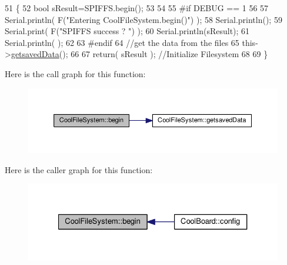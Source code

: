 \begin{DoxyCode}
51 \{
52     \textcolor{keywordtype}{bool} sResult=SPIFFS.begin();
53     
54 
55 \textcolor{preprocessor}{#if DEBUG == 1}
56 
57     Serial.println( F(\textcolor{stringliteral}{"Entering CoolFileSystem.begin()"}) );
58     Serial.println();   
59     Serial.print( F(\textcolor{stringliteral}{"SPIFFS success ? "}) );
60     Serial.println(sResult);
61     Serial.println(  );
62 
63 \textcolor{preprocessor}{#endif}
64     \textcolor{comment}{//get the data from the files}
65     this->\hyperlink{class_cool_file_system_a70701d05e811604af1b531f4f6dc69ed}{getsavedData}();
66 
67     \textcolor{keywordflow}{return}( sResult  );                                   \textcolor{comment}{//Initialize Filesystem}
68 
69 \}
\end{DoxyCode}
Here is the call graph for this function\+:\nopagebreak
\begin{figure}[H]
\begin{center}
\leavevmode
\includegraphics[width=350pt]{db/d0c/class_cool_file_system_a6ba6f666ed4c530174f8569d2c636748_cgraph}
\end{center}
\end{figure}
Here is the caller graph for this function\+:\nopagebreak
\begin{figure}[H]
\begin{center}
\leavevmode
\includegraphics[width=327pt]{db/d0c/class_cool_file_system_a6ba6f666ed4c530174f8569d2c636748_icgraph}
\end{center}
\end{figure}
\mbox{\label{class_cool_file_system_a13f2958f5b87757c31fc53797a30d23a}} 
